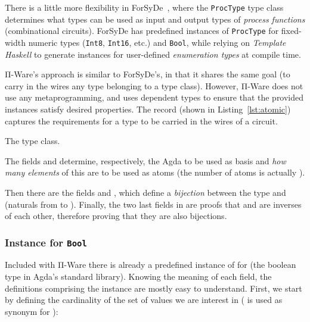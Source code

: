             There is a little more flexibility in ForSyDe~\cite{forsyde1999},
            where the \texttt{ProcType} type class determines what types can be used
            as input and output types of \emph{process functions} (combinational circuits).
            ForSyDe has predefined instances of \texttt{ProcType} for fixed-width numeric types
            (\texttt{Int8}, \texttt{Int16}, etc.) and \texttt{Bool},
            while relying on \emph{Template Haskell} to generate instances for user-defined \emph{enumeration types}
            at compile time.

            Π-Ware's approach is similar to ForSyDe's, in that it shares the same goal
            (to carry in the wires any type belonging to a type class).
            However, Π-Ware does not use any metaprogramming, and uses dependent types
            to ensure that the provided instances satisfy desired properties.
            The  record (shown in Listing~\ref{lst:atomic})
            captures the requirements for a type to be carried in the wires of a circuit.

            \begin{listing}[h]
                \caption{The  type class.\label{lst:atomic}}
            \end{listing}

            The fields  and  determine, respectively,
            the Agda  to be used as basis and \emph{how many elements} of this 
            are to be used as atoms (the number of atoms is actually  \AY{=}  ).

            Then there are the fields  and , which define a \emph{bijection}
            between the  type and   (naturals from  to ).
            Finally, the two last fields in  are proofs
            that  and  are inverses of each other,
            therefore proving that they are also bijections.

            \subsubsection{Instance for \texttt{Bool}}
            \label{subsubsec:atomic-bool}
            Included with Π-Ware there is already a predefined instance of  for 
            (the boolean type in Agda's standard library).
            Knowing the meaning of each field, the definitions comprising the instance
            are mostly easy to understand.
            First, we start by defining the cardinality of the set of values we are interest in
            ( is used as synonym for ):

